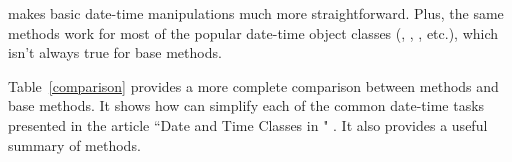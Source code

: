 \documentclass[article]{jss}
\begin{document}
 makes basic date-time manipulations much more straightforward. Plus, the same  methods work for most of the popular date-time object classes (, , , etc.), which isn't always true for base  methods.

Table~\ref{comparison} provides a more complete comparison between  methods and base  methods. It shows how  can simplify each of the common date-time tasks presented in the article ``Date and Time Classes in " \citep{Rnews}. It also provides a useful summary of  methods.



\begin{table}


\end{table}
\end{document}
